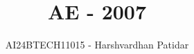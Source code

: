 \documentclass[journal]{IEEEtran}
\begin{document}

\vspace{3cm}

\title{AE - 2007}
\author{AI24BTECH11015 - Harshvardhan Patidar}
 \maketitle
{\let\newpage\relax\maketitle}

\renewcommand{\thefigure}{\theenumi}
\renewcommand{\thetable}{\theenumi}
\setlength{\intextsep}{10pt} %


\renewcommand{\thetable}{\theenumi}
\end{document}
